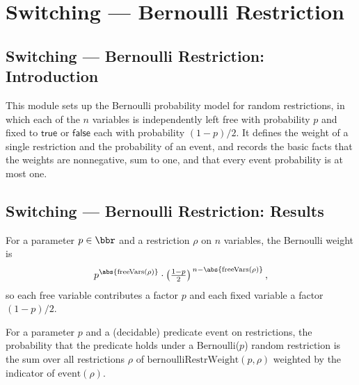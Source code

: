 \section{Switching --- Bernoulli Restriction}
\subsection*{Switching --- Bernoulli Restriction: Introduction}

This module sets up the Bernoulli probability model for random restrictions, in which
each of the $n$ variables is independently left free with probability $p$ and fixed to
$\mathsf{true}$ or $\mathsf{false}$ each with probability $(1-p)/2$. It defines the
weight of a single restriction and the probability of an event, and records the basic
facts that the weights are nonnegative, sum to one, and that every event probability is
at most one.

\subsection*{Switching --- Bernoulli Restriction: Results}

\begin{definition}
\label{SwitchingLemma.bernoulliRestrWeight}
\leanok
{}
For a parameter $p \in \bbr$ and a restriction $\rho$ on $n$ variables, the Bernoulli
weight is
\[
  p^{\abs{\mathrm{freeVars}(\rho)}} \cdot \left(\tfrac{1-p}{2}\right)^{\,n - \abs{\mathrm{freeVars}(\rho)}},
\]
so each free variable contributes a factor $p$ and each fixed variable a factor
$(1-p)/2$.
\end{definition}

\begin{definition}
\label{SwitchingLemma.bernoulliRestrProb}
\leanok
{}
For a parameter $p$ and a (decidable) predicate $\mathrm{event}$ on restrictions, the
probability that the predicate holds under a Bernoulli($p$) random restriction is the
sum over all restrictions $\rho$ of $\mathrm{bernoulliRestrWeight}(p,\rho)$ weighted by
the indicator of $\mathrm{event}(\rho)$.
\end{definition}

